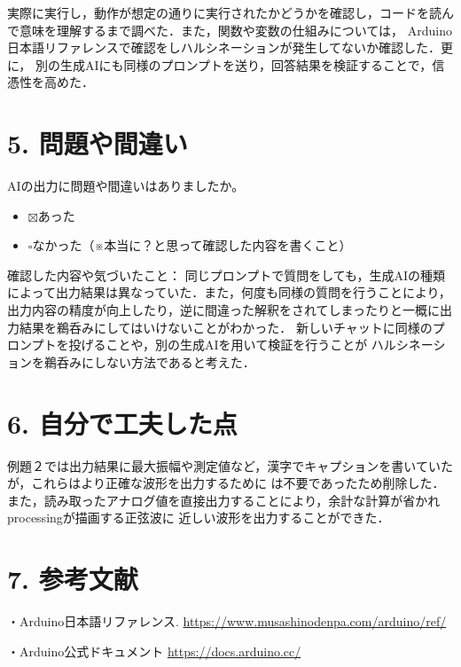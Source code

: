 \documentclass[a4paper,11pt,dvipdfmx]{jsarticle}
\newcommand{\cboxon}{$\boxtimes$}
\newcommand{\cboxoff}{$\square$}
\begin{document}
実際に実行し，動作が想定の通りに実行されたかどうかを確認し，コードを読んで意味を理解するまで調べた．また，関数や変数の仕組みについては，
Arduino日本語リファレンスで確認をしハルシネーションが発生してないか確認した．更に，
別の生成AIにも同様のプロンプトを送り，回答結果を検証することで，信憑性を高めた．


\section*{5. 問題や間違い}
AIの出力に問題や間違いはありましたか。
\begin{itemize}
  \item \cboxon あった
  \item \cboxoff なかった（※本当に？と思って確認した内容を書くこと）
\end{itemize}
確認した内容や気づいたこと：
同じプロンプトで質問をしても，生成AIの種類によって出力結果は異なっていた．また，何度も同様の質問を行うことにより，
出力内容の精度が向上したり，逆に間違った解釈をされてしまったりと一概に出力結果を鵜呑みにしてはいけないことがわかった．
新しいチャットに同様のプロンプトを投げることや，別の生成AIを用いて検証を行うことが
ハルシネーションを鵜呑みにしない方法であると考えた．

\section*{6. 自分で工夫した点}
例題２では出力結果に最大振幅や測定値など，漢字でキャプションを書いていたが，これらはより正確な波形を出力するために
は不要であったため削除した．また，読み取ったアナログ値を直接出力することにより，余計な計算が省かれprocessingが描画する正弦波に
近しい波形を出力することができた．

\section*{7. 参考文献}

  ・Arduino日本語リファレンス.  
  \url{https://www.musashinodenpa.com/arduino/ref/}\par

  ・Arduino公式ドキュメント
  \url{https://docs.arduino.cc/}\par



 
\end{document}
